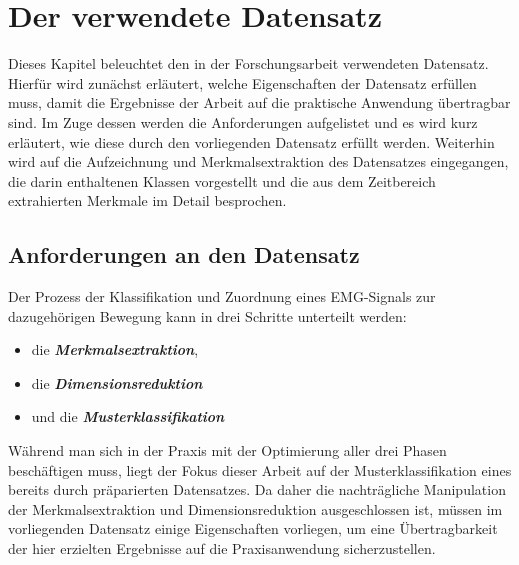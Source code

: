 \chapter{Der verwendete Datensatz}
\label{chap:datensatz}

Dieses Kapitel beleuchtet den in der Forschungsarbeit verwendeten Datensatz. Hierfür wird zunächst erläutert, welche Eigenschaften der Datensatz erfüllen muss, damit die Ergebnisse der Arbeit auf die praktische Anwendung übertragbar sind. Im Zuge dessen werden die Anforderungen aufgelistet und es wird kurz erläutert, wie diese durch den vorliegenden Datensatz erfüllt werden.
Weiterhin wird auf die Aufzeichnung und Merkmalsextraktion des Datensatzes eingegangen, die darin enthaltenen Klassen vorgestellt und die aus dem Zeitbereich extrahierten Merkmale im Detail besprochen.

\section{Anforderungen an den Datensatz}

Der Prozess der Klassifikation und Zuordnung eines EMG-Signals zur dazugehörigen Bewegung kann in drei Schritte unterteilt werden:

\begin{itemize}
	\item die \textbf{\textit{Merkmalsextraktion}},
	\item die \textbf{\textit{Dimensionsreduktion}}
	\item und die \textbf{\textit{Musterklassifikation}}
\end{itemize}

Während man sich in der Praxis mit der Optimierung aller drei Phasen beschäftigen muss, liegt der Fokus dieser Arbeit auf der Musterklassifikation eines bereits durch \cite{Kaufmann2013Data} präparierten Datensatzes. Da daher die nachträgliche Manipulation der Merkmalsextraktion und Dimensionsreduktion ausgeschlossen ist, müssen im vorliegenden Datensatz einige Eigenschaften vorliegen, um eine Übertragbarkeit der hier erzielten Ergebnisse auf die Praxisanwendung sicherzustellen.

